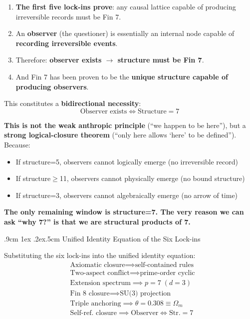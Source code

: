\documentclass[aps,prd,twocolumn,nofootinbib,floatfix]{revtex4-2}
\makeatletter
\def\subsection{%
  \@startsection{subsection}{2}{\z@}
    {.9cm \@plus1ex \@minus .2ex}{.5cm}
    {\normalfont\normalsize\bfseries\centering}%
}
\makeatother
\begin{document}
\begin{enumerate}
    \item \textbf{The first five lock-ins prove}: any causal lattice capable of producing irreversible records must be Fin 7.
    \item An \textbf{observer} (the questioner) is essentially an internal node capable of \textbf{recording irreversible events}.
    \item Therefore: \textbf{observer exists $\to$ structure must be Fin 7}.
    \item And Fin 7 has been proven to be the \textbf{unique structure capable of producing observers}.
\end{enumerate}

This constitutes a \textbf{bidirectional necessity}:
$$ \boxed{\text{Observer exists} \iff \text{Structure}=7} $$

\textbf{This is not the weak anthropic principle} (``we happen to be here''), but a \textbf{strong logical-closure theorem} (``only here allows `here' to be defined''). Because:
\begin{itemize}
    \item If structure=5, observers cannot logically emerge (no irreversible record)
    \item If structure$\geq$11, observers cannot physically emerge (no bound structure)
    \item If structure=3, observers cannot algebraically emerge (no arrow of time)
\end{itemize}

\textbf{The only remaining window is structure=7. The very reason we can ask ``why 7?'' is that we are structural products of 7.}

\subsection{Unified Identity Equation of the Six Lock-ins}

Substituting the six lock-ins into the unified identity equation:
$$
\boxed{
\begin{aligned}
&\text{Axiomatic closure} \implies \text{self-contained rules} \\
&\text{Two-aspect conflict} \implies \text{prime-order cyclic} \\
&\text{Extension spectrum} \implies p=7 \;(d=3) \\
&\text{Fin 8 closure} \implies \text{SU(3) projection} \\
&\text{Triple anchoring} \implies \theta = 0.308 \equiv \Omega_m \\
&\text{Self-ref. closure} \implies \text{Observer} \iff \text{Str.}=7
\end{aligned}
}
$$
\end{document}
